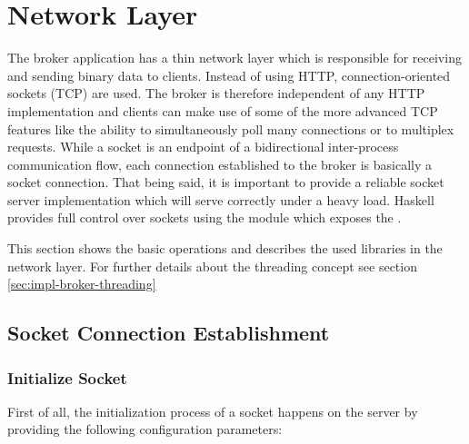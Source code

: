\newpage
\section{Network Layer}
\label{sec:broker-network}

The broker application has a thin network layer which is responsible for
receiving and sending binary data to clients. Instead of using HTTP, 
connection-oriented sockets (TCP) are used. The broker is therefore independent
of any HTTP implementation and clients can make use of some of the more advanced
TCP features like the ability to simultaneously poll many connections or to
multiplex requests. While a socket is an endpoint of a bidirectional
inter-process communication flow, each connection established to the broker is
basically a socket connection. That being said, it is important to provide a
reliable socket server implementation which will serve correctly under a heavy
load. Haskell provides full control over sockets using the
module which exposes the .

This section shows the basic operations and describes the used libraries in the
network layer. For further details about the threading concept see section
\ref{sec:impl-broker-threading} 

\subsection{Socket Connection Establishment}
\label{sec:impl-broker-socket-connection}


\subsubsection{Initialize Socket}

First of all, the initialization process of a socket happens on the server by providing the following configuration parameters:

